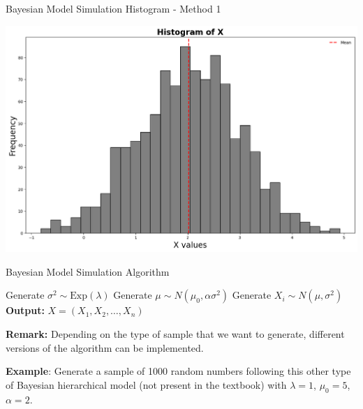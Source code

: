 \documentclass[8pt]{beamer}
\begin{document}
\begin{frame}[fragile]{Bayesian Model Simulation Histogram - Method 1}
\begin{center}
\includegraphics[width=\textwidth]{chapter2-part1-plot2.png}
\end{center}
\end{frame}

\begin{frame}{Bayesian Model Simulation Algorithm}
\begin{algorithm}[H]
\caption{Simulation from a Bayesian Model}\label{alg:bayesian-sim}
\begin{algorithmic}[1]
    \State Generate $\sigma^2 \sim \text{Exp}(\lambda)$
    \State Generate $\mu \sim N(\mu_0, \alpha \sigma^2)$
    \State Generate $X_i \sim N(\mu, \sigma^2)$
  \EndFor
  \State \textbf{Output:} $X = (X_1, X_2, \dots, X_n)$
\end{algorithmic}
\end{algorithm}

\vspace{2mm}

\textbf{Remark:} Depending on the type of sample that we want to generate, 
different versions of the algorithm can be implemented.

\vspace{2mm}

\textbf{Example}: Generate a sample of 1000 random numbers following this other type of Bayesian hierarchical model (not present in the textbook) with $\lambda=1$, $\mu_0=5$, $\alpha=2$.
\end{frame}
\end{document}
